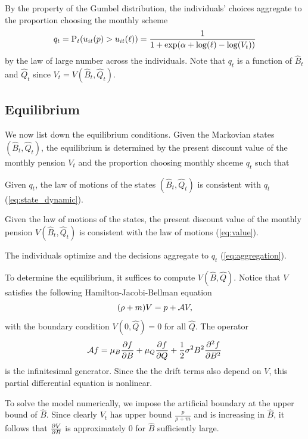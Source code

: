 \documentclass[a4paper, 12pt]{article}
\begin{document}
By the property of the Gumbel distribution, the individuals' choices 
aggregate to the proportion choosing the monthly scheme 
\begin{equation}\label{eq:aggregation}
    q_t = \P_t(u_{it}(p)>u_{it}(\ell)) = \frac{1}{1+\exp\pth{\alpha + \log(\ell) - \log(V_t)}}
\end{equation}
by the law of large number across the individuals. Note that 
$q_t$ is a function of $\hat{B}_t$ and $\hat{Q}_t$ since 
$V_t = V(\hat{B}_t, \hat{Q}_t)$. 

\subsection{Equilibrium}
We now list down the equilibrium conditions. Given the Markovian 
states $(\hat{B}_t, \hat{Q}_t)$, the equilibrium is determined 
by the present discount value of the monthly pension $V_t$ and 
the proportion choosing monthly shceme $q_t$ such that 
\begin{thmenum}
    \item Given $q_t$, the law of motions of the states $(\hat{B}_t, \hat{Q}_t)$ 
    is consistent with $q_t$ (\cref{eq:state_dynamic}).
    \item Given the law of motions of the states, the present 
    discount value of the monthly pension $V(\hat{B}_t, \hat{Q}_t)$ 
    is consistent with the law of motions (\cref{eq:value}). 
    \item The individuals optimize and the decisions aggregate 
    to $q_t$ (\cref{eq:aggregation}). 
\end{thmenum}

To determine the equilibrium, it suffices to compute $V(\hat{B}, \hat{Q})$. 
Notice that $V$ satisfies the following Hamilton-Jacobi-Bellman equation 
\begin{equation}
    (\rho + m)V = p + \mathcal{A} V, 
\end{equation}
with the boundary condition $V(0, \hat{Q}) = 0$ for all 
$\hat{Q}$. The operator 
\begin{equation}
    \mathcal{A} f = \mu_B\frac{\partial{f}}{\partial{B}} + \mu_Q\frac{\partial{f}}{\partial{Q}} + \frac{1}{2}\sigma^2B^2\frac{\partial^2{f}}{\partial{B}^2}
\end{equation}
is the infinitesimal generator. Since the the drift terms 
also depend on $V$, this partial differential equation is 
nonlinear. 

To solve the model numerically, we impose the artificial 
boundary at the upper bound of $\hat{B}$. Since clearly $V_t$ 
has upper bound $\frac{p}{\rho+m}$ and is increasing in $\hat{B}$, 
it follows that $\frac{\partial{V}}{\partial{B}}$ is approximately $0$ for $\hat{B}$ 
sufficiently large.
\end{document}
